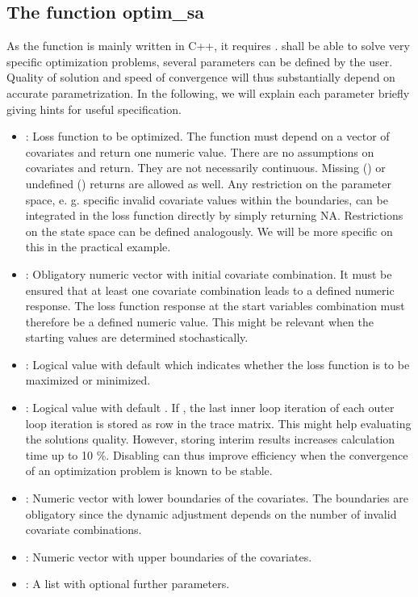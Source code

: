 \subsection{The function optim\_sa}
As the function is mainly written in C++, it requires .  shall be able to solve very specific optimization problems, several parameters can be defined by the user. Quality of solution and speed of convergence will thus substantially depend on accurate parametrization. In the following, we will explain each parameter briefly giving hints for useful specification.
\begin{itemize}
	\item {}: Loss function to be optimized. The function must depend on a vector of covariates and return one numeric value. There are no assumptions on covariates and return. They are not necessarily continuous. Missing () or undefined () returns are allowed as well. Any restriction on the parameter space, e. g. specific invalid covariate values within the boundaries, can be integrated in the loss function directly by simply returning NA. Restrictions on the state space can be defined analogously. We will be more specific on this in the practical example.
	\item {}: Obligatory numeric vector with initial covariate combination. It must be ensured that at least one covariate combination leads to a defined numeric response. The loss function response at the start variables combination must therefore be a defined numeric value. This might be relevant when the starting values are determined stochastically.
	\item {}: Logical value with default  which indicates whether the loss function is to be maximized or minimized.
	\item {}: Logical value with default . If , the last inner loop iteration of each outer loop iteration is stored as row in the trace matrix. This might help evaluating the solutions quality. However, storing interim results increases calculation time up to 10 \%. Disabling  can thus improve efficiency when the convergence of an optimization problem is known to be stable.
	\item {}: Numeric vector with lower boundaries of the covariates. The boundaries are obligatory since the dynamic  adjustment \citep{corana_1987, pronzato_1984} depends on the number of invalid covariate combinations.
	\item {}: Numeric vector with upper boundaries of the covariates.
	\item {}: A list with optional further parameters.
\end{itemize}
